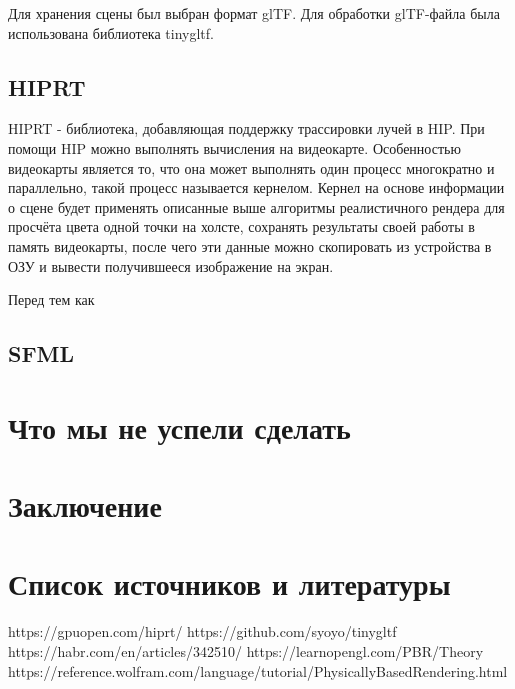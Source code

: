 \documentclass[a4paper,14pt]{extarticle}
\begin{document}
Для хранения сцены был выбран формат glTF. Для обработки glTF-файла была использована библиотека tinygltf. 
\subsection{HIPRT}
HIPRT - библиотека, добавляющая поддержку трассировки лучей в HIP. 
При помощи HIP можно выполнять вычисления на видеокарте.
Особенностью видеокарты является то, что она может выполнять один процесс многократно и параллельно, 
такой процесс называется кернелом. Кернел на основе информации о сцене 
будет применять описанные выше алгоритмы реалистичного рендера для просчёта цвета одной точки на холсте, 
сохранять результаты своей работы в память видеокарты, после чего эти данные можно скопировать из устройства в ОЗУ 
и вывести получившееся изображение на экран.

Перед тем как 

\subsection{SFML}

\section{Что мы не успели сделать}


\section{Заключение}
\section{Список источников и литературы}

https://gpuopen.com/hiprt/
https://github.com/syoyo/tinygltf
https://habr.com/en/articles/342510/
https://learnopengl.com/PBR/Theory
https://reference.wolfram.com/language/tutorial/PhysicallyBasedRendering.html
\end{document}
